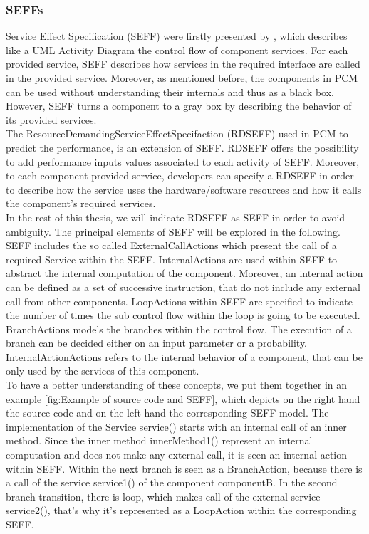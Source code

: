 \subsubsection{SEFFs}
\label{sec: SEFFs}
Service Effect Specification (SEFF) were firstly presented by \cite{koziolek2006parameter}, which describes like a UML Activity Diagram the control flow of component services. For each provided service, SEFF describes how services in the required interface are called in the provided service. Moreover, as mentioned before, the components in PCM can be used without understanding their internals and thus as a black box. However, SEFF turns a component to a gray box by describing the behavior of its provided services.\\
The ResourceDemandingServiceEffectSpecifaction (RDSEFF) used in PCM to predict the performance, is an extension of SEFF. RDSEFF offers the possibility to add performance inputs values associated to each activity of SEFF. Moreover, to each component provided service, developers can specify a RDSEFF in order to describe how the service uses the hardware/software resources and how it calls the component's required services. \\
In the rest of this thesis, we will indicate RDSEFF as SEFF in order to avoid ambiguity. The principal elements of SEFF will be explored in the following. SEFF includes the so called ExternalCallActions which present the call of a required Service within the SEFF. InternalActions are used within SEFF to abstract the internal computation of the component. Moreover, an internal action can be defined as a set of successive instruction, that do not include any external call from other components. LoopActions within SEFF are specified to indicate the number of times the sub control flow within the loop is going to be executed. BranchActions models the branches within the control flow. The execution of a branch can be decided either on an input parameter or a probability. InternalActionActions refers to the internal behavior of a component, that can be only used by the services of this component. \\
To have a better understanding of these concepts, we put them together in an example \ref{fig:Example of source code and SEFF}, which depicts on the right hand the source code and on the left hand the corresponding SEFF model. The implementation of the Service service() starts with an internal call of an inner method. Since the inner method innerMethod1() represent an internal computation and does not make any external call, it is seen an internal action within SEFF. Within the next branch is seen as a BranchAction, because there is a call of the service service1() of the component componentB. In the second branch transition, there is loop, which makes call of the external service service2(), that’s why it’s represented as a LoopAction within the corresponding SEFF. \\

